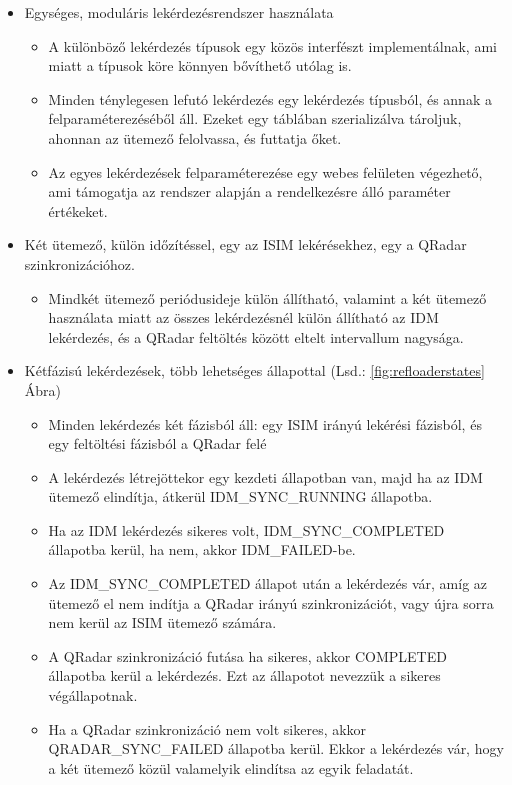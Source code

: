 \begin{itemize}
	\item Egységes, moduláris lekérdezésrendszer használata
	\begin{itemize}
		\item A különböző lekérdezés típusok egy közös interfészt implementálnak, ami miatt a típusok köre könnyen bővíthető utólag is.
		\item Minden ténylegesen lefutó lekérdezés egy lekérdezés típusból, és annak a felparaméterezéséből áll. Ezeket egy táblában szerializálva tároljuk, ahonnan az ütemező felolvassa, és futtatja őket.
		\item Az egyes lekérdezések felparaméterezése egy webes felületen végezhető, ami támogatja az rendszer alapján a rendelkezésre álló paraméter értékeket.
	\end{itemize}
	
	\item Két ütemező, külön időzítéssel, egy az ISIM lekérésekhez, egy a QRadar szinkronizációhoz.
		\begin{itemize}
		\item Mindkét ütemező periódusideje külön állítható, valamint a két ütemező használata miatt az összes lekérdezésnél külön állítható az IDM lekérdezés, és a QRadar feltöltés között eltelt intervallum nagysága.
	\end{itemize}
	
	\item Kétfázisú lekérdezések, több lehetséges állapottal (Lsd.: \ref{fig:refloaderstates} Ábra)
	\begin{itemize}
		\item Minden lekérdezés két fázisból áll: egy ISIM irányú lekérési fázisból, és egy feltöltési fázisból a QRadar felé
		\item A lekérdezés létrejöttekor egy kezdeti állapotban van, majd ha az IDM ütemező elindítja, átkerül IDM\_SYNC\_RUNNING állapotba.
		\item Ha az IDM lekérdezés sikeres volt, IDM\_SYNC\_COMPLETED állapotba kerül, ha nem, akkor IDM\_FAILED-be.
		\item Az IDM\_SYNC\_COMPLETED állapot után a lekérdezés vár, amíg az ütemező el nem indítja a QRadar irányú szinkronizációt, vagy újra sorra nem kerül az ISIM ütemező számára.
		\item A QRadar szinkronizáció futása ha sikeres, akkor COMPLETED állapotba kerül a lekérdezés. Ezt az állapotot nevezzük a sikeres végállapotnak.
		\item Ha a QRadar szinkronizáció nem volt sikeres, akkor QRADAR\_SYNC\_FAILED állapotba kerül. Ekkor a lekérdezés vár, hogy a két ütemező közül valamelyik elindítsa az egyik feladatát.
	\end{itemize}


\end{itemize}
